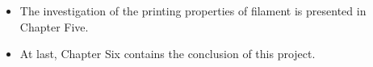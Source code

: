 \begin{itemize}
\item The investigation of the printing properties of filament is presented in Chapter Five.
\end{itemize}

\begin{itemize}
\item  At last, Chapter Six contains the conclusion of this project.
\end{itemize}


